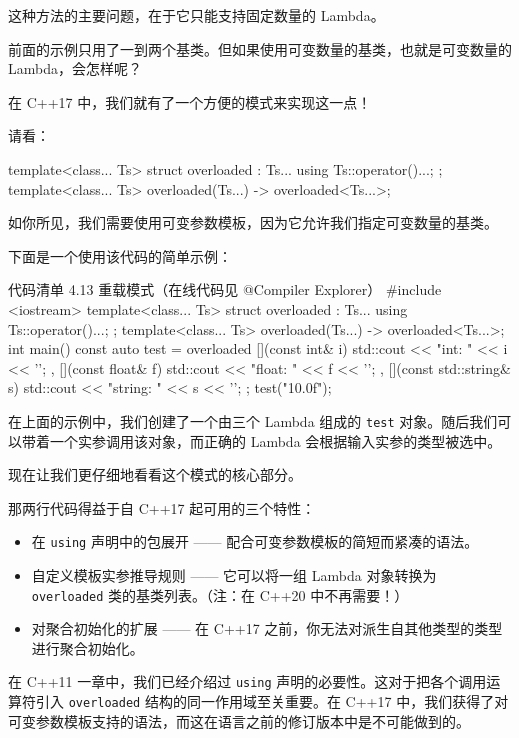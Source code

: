 这种方法的主要问题，在于它只能支持固定数量的 Lambda。

前面的示例只用了一到两个基类。但如果使用可变数量的基类，也就是可变数量的 Lambda，会怎样呢？

在 C++17 中，我们就有了一个方便的模式来实现这一点！

请看：

\begin{codebox}
template<class... Ts> struct overloaded : Ts... { using Ts::operator()...; };
template<class... Ts> overloaded(Ts...) -> overloaded<Ts...>;
\end{codebox}

如你所见，我们需要使用可变参数模板，因为它允许我们指定可变数量的基类。

下面是一个使用该代码的简单示例：

\begin{codeboxt}{代码清单 4.13 重载模式（在线代码见 @Compiler Explorer）}
#include <iostream>
template<class... Ts> struct overloaded : Ts... { using Ts::operator()...; };
template<class... Ts> overloaded(Ts...) -> overloaded<Ts...>;
int main() {
const auto test = overloaded{
[](const int& i) { std::cout << "int: " << i << '\n'; },
[](const float& f) { std::cout << "float: " << f << '\n'; },
[](const std::string& s) { std::cout << "string: " << s << '\n'; }
};
test("10.0f");
}
\end{codeboxt}

在上面的示例中，我们创建了一个由三个 Lambda 组成的 \texttt{test} 对象。随后我们可以带着一个实参调用该对象，而正确的 Lambda 会根据输入实参的类型被选中。

现在让我们更仔细地看看这个模式的核心部分。

那两行代码得益于自 C++17 起可用的三个特性：

\begin{itemize}
\item 在 \texttt{using} 声明中的包展开 —— 配合可变参数模板的简短而紧凑的语法。
\item 自定义模板实参推导规则 —— 它可以将一组 Lambda 对象转换为 \texttt{overloaded} 类的基类列表。（注：在 C++20 中不再需要！）
\item 对聚合初始化的扩展 —— 在 C++17 之前，你无法对派生自其他类型的类型进行聚合初始化。
\end{itemize}

在 C++11 一章中，我们已经介绍过 \texttt{using} 声明的必要性。这对于把各个调用运算符引入 \texttt{overloaded} 结构的同一作用域至关重要。在 C++17 中，我们获得了对可变参数模板支持的语法，而这在语言之前的修订版本中是不可能做到的。

